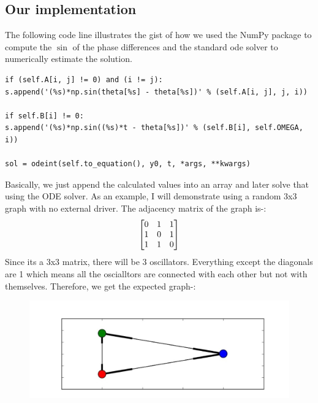 \subsection{Our implementation}
The following code line illustrates the gist of how we used the NumPy package to compute the $\sin$ of the phase differences and the standard ode solver to numerically estimate the solution.
\begin{lstlisting}
if (self.A[i, j] != 0) and (i != j):
s.append('(%s)*np.sin(theta[%s] - theta[%s])' % (self.A[i, j], j, i))

if self.B[i] != 0:
s.append('(%s)*np.sin((%s)*t - theta[%s])' % (self.B[i], self.OMEGA, i))

sol = odeint(self.to_equation(), y0, t, *args, **kwargs)
\end{lstlisting}
Basically, we just append the calculated values into an array and later solve that using the ODE solver. As an example, I will demonstrate using a random 3x3 graph with no external driver. The adjacency matrix of the graph is-:
\[
\begin{bmatrix}
	\centering
	0 & 1 & 1\\ 
	1 & 0 & 1\\ 
	1 & 1 & 0
\end{bmatrix}
\]
Since its a 3x3 matrix, there will be 3 oscillators. Everything except the diagonals are 1 which means all the oscialltors are connected with each other but not with themselves. Therefore, we get the expected graph-:
\begin{figure}[h!]
	\centering
	\includegraphics[width=0.8\linewidth]{imgs/examplefigure2}
	\caption{}
\end{figure}


